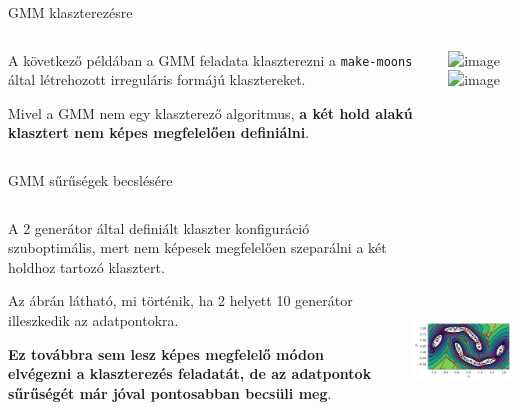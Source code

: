 \documentclass[english, aspectratio=169]{beamer}
\begin{document}
\begin{frame}{GMM klaszterezésre}
\begin{columns}
\begin{column}{.5\textwidth}
A következő példában a GMM feladata klaszterezni a \texttt{make-moons} által létrehozott irreguláris formájú klasztereket.\par\smallskip
Mivel a GMM nem egy klaszterező algoritmus, \textbf{a két hold alakú klasztert nem képes megfelelően definiálni}. 
\end{column}
\begin{column}{.5\textwidth}
\begin{center}
\includegraphics<1>[width=7cm, height=7cm, keepaspectratio]{images/generative_25.png}
\includegraphics<2>[width=7cm, height=7cm, keepaspectratio]{images/generative_27.png}
\end{center}
\end{column}
\end{columns}
\end{frame}

\begin{frame}{GMM sűrűségek becslésére}
\begin{columns}
\begin{column}{.5\textwidth}
A 2 generátor által definiált klaszter konfiguráció szuboptimális, mert nem képesek megfelelően szeparálni a két holdhoz tartozó klasztert.\par\smallskip
Az ábrán látható, mi történik, ha 2 helyett 10 generátor illeszkedik az adatpontokra.\par\smallskip
\textbf{Ez továbbra sem lesz képes megfelelő módon elvégezni a klaszterezés feladatát, de az adatpontok sűrűségét már jóval pontosabban becsüli meg}. 
\end{column}
\begin{column}{.5\textwidth}
\begin{center}
\includegraphics[width=7cm, height=7cm, keepaspectratio]{images/generative_26.png}
\end{center}
\end{column}
\end{columns}
\end{frame}
\end{document}
